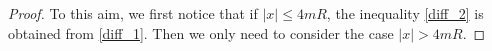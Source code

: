 \documentclass[letterpaper, 11pt,  reqno]{amsart}
\theoremstyle{definition}
\theoremstyle{remark}
\numberwithin{equation}{section}
\newcommand{\R}{{\mathbb R}}
\begin{document}
\begin{proof}
To this aim, we first notice that if $|x|\le 4mR$, the inequality \eqref{diff_2} is  obtained from \eqref{diff_1}. Then  we only need to consider the case $|x|>4mR$.  
		

\end{proof}
\end{document}
